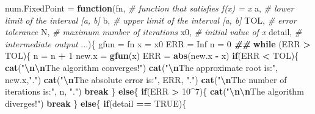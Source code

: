 \documentclass[
]{book}
\newenvironment{Shaded}{\begin{snugshade}}{\end{snugshade}}
\newcommand{\CommentTok}[1]{\textcolor[rgb]{0.56,0.35,0.01}{\textit{#1}}}
\newcommand{\ConstantTok}[1]{\textcolor[rgb]{0.56,0.35,0.01}{#1}}
\newcommand{\ControlFlowTok}[1]{\textcolor[rgb]{0.13,0.29,0.53}{\textbf{#1}}}
\newcommand{\DecValTok}[1]{\textcolor[rgb]{0.00,0.00,0.81}{#1}}
\newcommand{\DocumentationTok}[1]{\textcolor[rgb]{0.56,0.35,0.01}{\textbf{\textit{#1}}}}
\newcommand{\FunctionTok}[1]{\textcolor[rgb]{0.13,0.29,0.53}{\textbf{#1}}}
\newcommand{\NormalTok}[1]{#1}
\newcommand{\OtherTok}[1]{\textcolor[rgb]{0.56,0.35,0.01}{#1}}
\newcommand{\SpecialCharTok}[1]{\textcolor[rgb]{0.81,0.36,0.00}{\textbf{#1}}}
\newcommand{\StringTok}[1]{\textcolor[rgb]{0.31,0.60,0.02}{#1}}
\begin{document}
\begin{Shaded}
\begin{Highlighting}[]
\NormalTok{num.FixedPoint }\OtherTok{=} \ControlFlowTok{function}\NormalTok{(fn,       }\CommentTok{\# function that satisfies f(x) = x}
\NormalTok{                          a,        }\CommentTok{\# lower limit of the interval [a, b]}
\NormalTok{                          b,        }\CommentTok{\# upper limit of the interval [a, b]}
\NormalTok{                          TOL,      }\CommentTok{\# error tolerance}
\NormalTok{                          N,        }\CommentTok{\# maximum number of iterations}
\NormalTok{                          x0,       }\CommentTok{\# initial value of x}
\NormalTok{                          detail,    }\CommentTok{\# intermediate output}
\NormalTok{                          ...)\{}
\NormalTok{ gfun }\OtherTok{=}\NormalTok{ fn}
\NormalTok{ x }\OtherTok{=}\NormalTok{ x0}
\NormalTok{ ERR }\OtherTok{=} \ConstantTok{Inf}
\NormalTok{ n }\OtherTok{=} \DecValTok{0}
\DocumentationTok{\#\# }
 \ControlFlowTok{while}\NormalTok{ (ERR }\SpecialCharTok{\textgreater{}}\NormalTok{ TOL)\{}
\NormalTok{  n }\OtherTok{=}\NormalTok{ n }\SpecialCharTok{+} \DecValTok{1}
\NormalTok{  new.x }\OtherTok{=} \FunctionTok{gfun}\NormalTok{(x)}
\NormalTok{  ERR }\OtherTok{=} \FunctionTok{abs}\NormalTok{(new.x }\SpecialCharTok{{-}}\NormalTok{ x)}
  \ControlFlowTok{if}\NormalTok{(ERR }\SpecialCharTok{\textless{}}\NormalTok{ TOL)\{}
    \FunctionTok{cat}\NormalTok{(}\StringTok{"}\SpecialCharTok{\textbackslash{}n\textbackslash{}n}\StringTok{The algorithm converges!"}\NormalTok{)}
    \FunctionTok{cat}\NormalTok{(}\StringTok{"}\SpecialCharTok{\textbackslash{}n}\StringTok{The approximate root is:"}\NormalTok{, new.x,}\StringTok{"."}\NormalTok{)}
    \FunctionTok{cat}\NormalTok{(}\StringTok{"}\SpecialCharTok{\textbackslash{}n}\StringTok{The absolute error is:"}\NormalTok{, ERR, }\StringTok{"."}\NormalTok{)}
    \FunctionTok{cat}\NormalTok{(}\StringTok{"}\SpecialCharTok{\textbackslash{}n}\StringTok{The number of iterations is:"}\NormalTok{, n, }\StringTok{"."}\NormalTok{)}
    \ControlFlowTok{break}
\NormalTok{  \} }\ControlFlowTok{else}\NormalTok{\{}
    \ControlFlowTok{if}\NormalTok{(ERR }\SpecialCharTok{\textgreater{}} \DecValTok{10}\SpecialCharTok{\^{}}\DecValTok{7}\NormalTok{)\{}
        \FunctionTok{cat}\NormalTok{(}\StringTok{"}\SpecialCharTok{\textbackslash{}n\textbackslash{}n}\StringTok{The algorithm diverges!"}\NormalTok{)}
        \ControlFlowTok{break}
\NormalTok{    \} }\ControlFlowTok{else}\NormalTok{\{}
         \ControlFlowTok{if}\NormalTok{(detail }\SpecialCharTok{==} \ConstantTok{TRUE}\NormalTok{)\{}

\end{Highlighting}
\end{Shaded}
\end{document}
